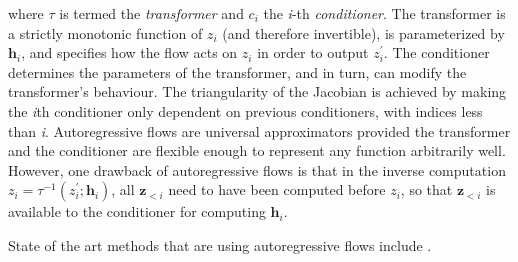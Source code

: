 \documentclass[english]{scrartcl}
\begin{document}
    where $\tau$ is termed the \textit{transformer} and $c_i$ the \textit{i}-th \textit{conditioner}.
    The transformer is a strictly monotonic function of $z_i$ (and therefore invertible), is parameterized by $\textbf{h}_i$, and specifies how the flow acts on $z_i$ in order to output $z_i^{\prime}$.
    The conditioner determines the parameters of the transformer, and in turn, can modify the transformer's behaviour.
    The triangularity of the Jacobian is achieved by making the \textit{i}th conditioner only dependent on previous conditioners, with indices less than \textit{i}.
    Autoregressive flows are universal approximators provided the transformer and the conditioner are flexible enough to represent any function arbitrarily well.
    However, one drawback of autoregressive flows is that in the inverse computation $z_i = \tau ^{-1} (z_i ^{\prime}; \textbf{h}_i)$, all $\textbf{z}_{<i}$ need to have been computed before $z_i$, so that $\textbf{z}_{<i}$ is available to the conditioner for computing $\textbf{h}_i$.

    State of the art methods that are using autoregressive flows include \citep[][NICE, Flow++, Glow, PixelCNN]{dinh_nice_2015, ho_flow_2019, kingma_glow_2018, oord_conditional_2016}.
\end{document}
